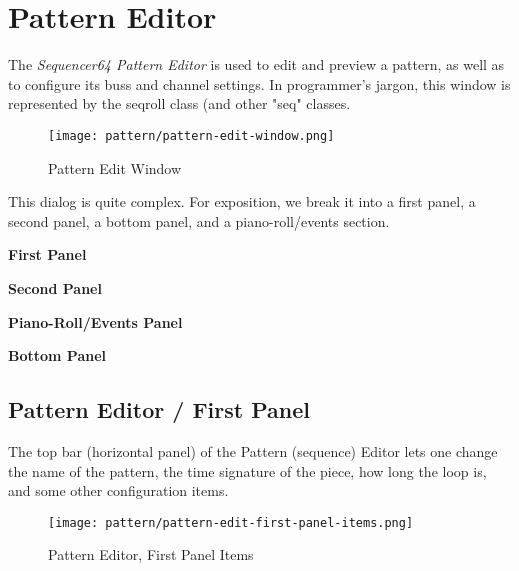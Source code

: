 %
%

\section{Pattern Editor}
\label{sec:seq64_pattern_editor}

   The \textsl{Sequencer64 Pattern Editor} is used to edit and preview a
   pattern, as well as to configure its buss and channel settings.
   In programmer's jargon, this window is represented by the seqroll class (and
   other "seq" classes.

\begin{figure}[H]
   \centering 
   \texttt{[image: pattern/pattern-edit-window.png]}
   \caption{Pattern Edit Window}
   \label{fig:pattern_edit_window}
\end{figure}

   This dialog is quite complex.
   For exposition, we break it into a first panel, a second panel, a
   bottom panel, and a piano-roll/events section.

   \begin{enumber}
      \item \textbf{First Panel}
      \item \textbf{Second Panel}
      \item \textbf{Piano-Roll/Events Panel}
      \item \textbf{Bottom Panel}
   \end{enumber}

\subsection{Pattern Editor / First Panel}
\label{subsec:seq64_pattern_editor_first}

   The top bar (horizontal panel) of the Pattern (sequence) Editor
   lets one change the name of
   the pattern, the time signature of the piece, how long the loop is, and
   some other configuration items.

\begin{figure}[H]
   \centering 
   \texttt{[image: pattern/pattern-edit-first-panel-items.png]}
   \caption{Pattern Editor, First Panel Items}
   \label{fig:pattern_editor_first_panel_items}
\end{figure}

